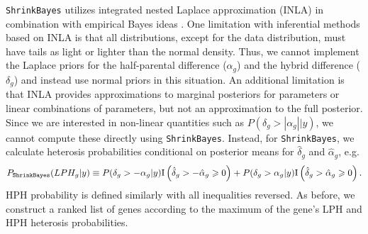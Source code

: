 \documentclass[useAMS,usenatbib,referee]{biom}
\newcommand{\ShrinkBayes}{{\tt ShrinkBayes}}
\begin{document}
\ShrinkBayes{} utilizes integrated nested Laplace approximation (INLA) \citep{rue2009approximate} in combination with empirical Bayes ideas \citep{van2014shrinkbayes}. One limitation with inferential methods based on INLA is that all distributions, except for the data distribution, must have tails as light or lighter than the normal density. Thus, we cannot implement the Laplace priors for the half-parental difference ($\alpha_g$) and the hybrid difference ($\delta_g$) and instead use normal priors in this situation. An additional limitation is that INLA provides approximations to marginal posteriors for parameters or linear combinations of parameters, but not an approximation to the full posterior. Since we are interested in non-linear quantities such as $P(\delta_g > |\alpha_g||y)$, we cannot compute these directly using \ShrinkBayes{}. Instead, for \ShrinkBayes{}, we calculate heterosis probabilities conditional on posterior means for $\hat{\delta}_g$ and $\hat{\alpha}_g$, e.g. 
\[ 
P_{\ShrinkBayes{}}(LPH_g|y) \equiv P(\delta_g>-\alpha_g|y)\mathrm{I}\left(\hat{\delta}_g > -\hat{\alpha}_g \ge 0\right) + P(\delta_g>\alpha_g|y) \mathrm{I}\left(\hat{\delta}_g > \hat{\alpha}_g \ge 0\right).
\]
HPH probability is defined similarly with all inequalities reversed. As before, we construct a ranked list of genes according to the maximum of the gene's LPH and HPH heterosis probabilities.
\end{document}
